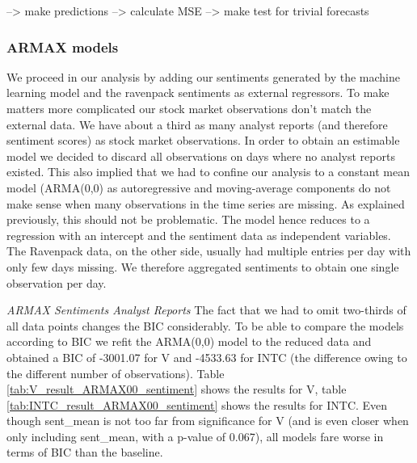 \begin{table}[h]
    \centering
    
    \caption{}
    \label{tab:V_ARMA11_log_returns}
\end{table}{}

\begin{table}[h!]
    \centering
    
    \caption{}
    \label{tab:V_ARMA11_log_returns}
\end{table}{}

\begin{table}[h!]
    \centering
    
    \caption{}
    \label{tab:INTC_ARMA00_log_returns}
\end{table}{}


--> make predictions
--> calculate MSE
--> make test for trivial forecasts

\subsubsection{ARMAX models}
We proceed in our analysis by adding our sentiments generated by the machine learning model and the ravenpack sentiments as external regressors. To make matters more complicated our stock market observations don't match the external data. We have about a third as many analyst reports (and therefore sentiment scores) as stock market observations. In order to obtain an estimable model we decided to discard all observations on days where no analyst reports existed. This also implied that we had to confine our analysis to a constant mean model (ARMA(0,0) as autoregressive and moving-average components do not make sense when many observations in the time series are missing. As explained previously, this should not be problematic. The model hence reduces to a regression with an intercept and the sentiment data as independent variables. The Ravenpack data, on the other side, usually had multiple entries per day with only few days missing. We therefore aggregated sentiments to obtain one single observation per day. 

\textit{ARMAX Sentiments Analyst Reports}
The fact that we had to omit two-thirds of all data points changes the BIC considerably. To be able to compare the models according to BIC we refit the ARMA(0,0) model to the reduced data and obtained a BIC of -3001.07 for V and -4533.63 for INTC (the difference owing to the different number of observations). Table \ref{tab:V_result_ARMAX00_sentiment} shows the results for V, table \ref{tab:INTC_result_ARMAX00_sentiment} shows the results for INTC. Even though sent\_mean is not too far from significance for V (and is even closer when only including sent\_mean, with a p-value of 0.067), all models fare worse in terms of BIC than the baseline. 

